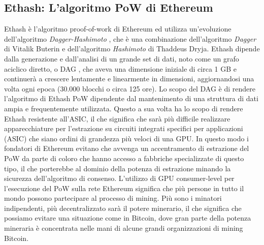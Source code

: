 \subsection*{Ethash: L'algoritmo PoW di Ethereum}
Ethash \cite{wiki:ethash} è l'algoritmo proof-of-work di Ethereum ed utilizza un'evoluzione dell'algoritmo \textit{Dagger-Hashimoto} \cite{wiki:dagger-hashimoto}, che è una combinazione dell'algoritmo \textit{Dagger} \cite{dagger:vitalik-buterin} di Vitalik Buterin e dell'algoritmo \textit{Hashimoto} \cite{hashimoto:thaddeus-dryja} di Thaddeus Dryja. Ethash dipende dalla generazione e dall'analisi di un grande set di dati, noto come un grafo aciclico diretto, o DAG \cite{wiki:dag}, che aveva una dimensione iniziale di circa 1 GB e continuerà a crescere lentamente e linearmente in dimensioni, aggiornandosi una volta ogni epoca (30.000 blocchi o circa 125 ore). Lo scopo del DAG è di rendere l'algoritmo di Ethash PoW dipendente dal mantenimento di una struttura di dati ampia e frequentemente utilizzata. Questo a sua volta ha lo scopo di rendere Ethash resistente all'ASIC, il che significa che sarà più difficile realizzare apparecchiature per l'estrazione su circuiti integrati specifici per applicazioni (ASIC) che siano ordini di grandezza più veloci di una GPU. In questo modo i fondatori di Ethereum evitano che avvenga un accentramento di estrazione del PoW da parte di coloro che hanno accesso a fabbriche specializzate di questo tipo, il che porterebbe al dominio della potenza di estrazione minando la sicurezza dell'algoritmo di consenso. L'utilizzo di GPU consumer-level per l'esecuzione del PoW sulla rete Ethereum significa che più persone in tutto il mondo possono partecipare al processo di mining. Più sono i minatori indipendenti, più decentralizzato sarà il potere minerario, il che significa che possiamo evitare una situazione come in Bitcoin, dove gran parte della potenza mineraria è concentrata nelle mani di alcune grandi organizzazioni di mining Bitcoin.